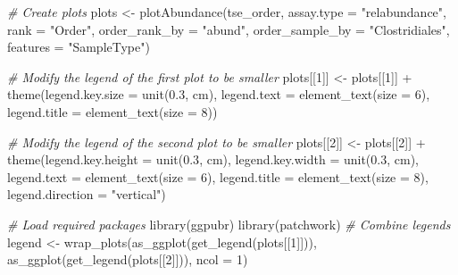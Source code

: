 \documentclass[
]{book}
\newenvironment{Shaded}{\begin{snugshade}}{\end{snugshade}}
\newcommand{\AttributeTok}[1]{\textcolor[rgb]{0.77,0.63,0.00}{#1}}
\newcommand{\CommentTok}[1]{\textcolor[rgb]{0.56,0.35,0.01}{\textit{#1}}}
\newcommand{\DecValTok}[1]{\textcolor[rgb]{0.00,0.00,0.81}{#1}}
\newcommand{\FloatTok}[1]{\textcolor[rgb]{0.00,0.00,0.81}{#1}}
\newcommand{\FunctionTok}[1]{\textcolor[rgb]{0.00,0.00,0.00}{#1}}
\newcommand{\NormalTok}[1]{#1}
\newcommand{\OtherTok}[1]{\textcolor[rgb]{0.56,0.35,0.01}{#1}}
\newcommand{\SpecialCharTok}[1]{\textcolor[rgb]{0.00,0.00,0.00}{#1}}
\newcommand{\StringTok}[1]{\textcolor[rgb]{0.31,0.60,0.02}{#1}}
\begin{document}
\begin{Shaded}
\begin{Highlighting}[]
\CommentTok{\# Create plots}
\NormalTok{plots }\OtherTok{\textless{}{-}} \FunctionTok{plotAbundance}\NormalTok{(tse\_order,}
            \AttributeTok{assay.type =} \StringTok{"relabundance"}\NormalTok{,}
        \AttributeTok{rank =} \StringTok{"Order"}\NormalTok{,}
            \AttributeTok{order\_rank\_by =} \StringTok{"abund"}\NormalTok{,}
        \AttributeTok{order\_sample\_by =} \StringTok{"Clostridiales"}\NormalTok{,}
            \AttributeTok{features =} \StringTok{"SampleType"}\NormalTok{)}

\CommentTok{\# Modify the legend of the first plot to be smaller }
\NormalTok{plots[[}\DecValTok{1}\NormalTok{]] }\OtherTok{\textless{}{-}}\NormalTok{ plots[[}\DecValTok{1}\NormalTok{]] }\SpecialCharTok{+}
    \FunctionTok{theme}\NormalTok{(}\AttributeTok{legend.key.size =} \FunctionTok{unit}\NormalTok{(}\FloatTok{0.3}\NormalTok{, }\StringTok{\textquotesingle{}cm\textquotesingle{}}\NormalTok{),}
          \AttributeTok{legend.text =} \FunctionTok{element\_text}\NormalTok{(}\AttributeTok{size =} \DecValTok{6}\NormalTok{),}
          \AttributeTok{legend.title =} \FunctionTok{element\_text}\NormalTok{(}\AttributeTok{size =} \DecValTok{8}\NormalTok{))}

\CommentTok{\# Modify the legend of the second plot to be smaller }
\NormalTok{plots[[}\DecValTok{2}\NormalTok{]] }\OtherTok{\textless{}{-}}\NormalTok{ plots[[}\DecValTok{2}\NormalTok{]] }\SpecialCharTok{+}
    \FunctionTok{theme}\NormalTok{(}\AttributeTok{legend.key.height =} \FunctionTok{unit}\NormalTok{(}\FloatTok{0.3}\NormalTok{, }\StringTok{\textquotesingle{}cm\textquotesingle{}}\NormalTok{),}
          \AttributeTok{legend.key.width =} \FunctionTok{unit}\NormalTok{(}\FloatTok{0.3}\NormalTok{, }\StringTok{\textquotesingle{}cm\textquotesingle{}}\NormalTok{),}
          \AttributeTok{legend.text =} \FunctionTok{element\_text}\NormalTok{(}\AttributeTok{size =} \DecValTok{6}\NormalTok{),}
          \AttributeTok{legend.title =} \FunctionTok{element\_text}\NormalTok{(}\AttributeTok{size =} \DecValTok{8}\NormalTok{),}
          \AttributeTok{legend.direction =} \StringTok{"vertical"}\NormalTok{)}

\CommentTok{\# Load required packages}
\FunctionTok{library}\NormalTok{(ggpubr)}
\FunctionTok{library}\NormalTok{(patchwork) }
\CommentTok{\# Combine legends}
\NormalTok{legend }\OtherTok{\textless{}{-}} \FunctionTok{wrap\_plots}\NormalTok{(}\FunctionTok{as\_ggplot}\NormalTok{(}\FunctionTok{get\_legend}\NormalTok{(plots[[}\DecValTok{1}\NormalTok{]])), }\FunctionTok{as\_ggplot}\NormalTok{(}\FunctionTok{get\_legend}\NormalTok{(plots[[}\DecValTok{2}\NormalTok{]])), }\AttributeTok{ncol =} \DecValTok{1}\NormalTok{) }


\end{Highlighting}
\end{Shaded}
\end{document}
